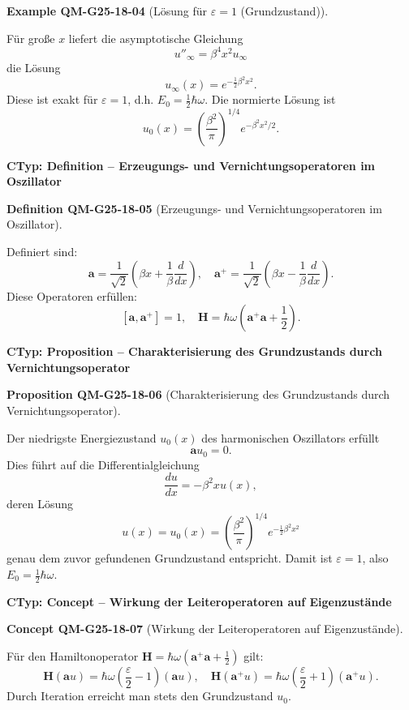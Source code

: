 \documentclass[10pt, letterpaper]{article}
\newcommand{\CustomHeading}[3]{%
  \par\medskip\noindent%
  \textbf{#1 #2} \textnormal{(#3)}.\enskip%
}
\newenvironment{DEF}[2]{\begin{unitbox}\CustomHeading{Definition}{#1}{#2}}{\end{unitbox}}
\newenvironment{PROP}[2]{\begin{unitbox}\CustomHeading{Proposition}{#1}{#2}}{\end{unitbox}}
\newenvironment{EXA}[2]{\begin{unitbox}\CustomHeading{Example}{#1}{#2}}{\end{unitbox}}
\newenvironment{CONC}[2]{\begin{unitbox}\CustomHeading{Concept}{#1}{#2}}{\end{unitbox}}
\begin{document}
\begin{EXA}{QM-G25-18-04}{Lösung für $\varepsilon = 1$ (Grundzustand)}
Für große $x$ liefert die asymptotische Gleichung
\[
u''_\infty = \beta^4 x^2 u_\infty
\]
die Lösung
\[
u_\infty(x) = e^{-\frac{1}{2}\beta^2 x^2}.
\]
Diese ist exakt für $\varepsilon = 1$, d.h. $E_0 = \frac{1}{2}\hbar\omega$. Die normierte Lösung ist
\[
u_0(x) = \left(\frac{\beta^2}{\pi}\right)^{1/4} e^{-\beta^2 x^2 / 2}.
\]
\end{EXA}



\textbf{CTyp: Definition – Erzeugungs- und Vernichtungsoperatoren im Oszillator}

\begin{DEF}{QM-G25-18-05}{Erzeugungs- und Vernichtungsoperatoren im Oszillator}
Definiert sind:
\[
\mathbf{a} = \frac{1}{\sqrt{2}} \left( \beta x + \frac{1}{\beta} \frac{d}{dx} \right), \quad
\mathbf{a}^+ = \frac{1}{\sqrt{2}} \left( \beta x - \frac{1}{\beta} \frac{d}{dx} \right).
\]
Diese Operatoren erfüllen:
\[
[\mathbf{a}, \mathbf{a}^+] = 1, \quad \mathbf{H} = \hbar\omega\left( \mathbf{a}^+ \mathbf{a} + \frac{1}{2} \right).
\]
\end{DEF}


\textbf{CTyp: Proposition – Charakterisierung des Grundzustands durch Vernichtungsoperator}

\begin{PROP}{QM-G25-18-06}{Charakterisierung des Grundzustands durch Vernichtungsoperator}
Der niedrigste Energiezustand $u_0(x)$ des harmonischen Oszillators erfüllt
\[
\mathbf{a} u_0 = 0.
\]
Dies führt auf die Differentialgleichung
\[
\frac{du}{dx} = -\beta^2 x u(x),
\]
deren Lösung
\[
u(x) = u_0(x) = \left(\frac{\beta^2}{\pi}\right)^{1/4} e^{-\frac{1}{2} \beta^2 x^2}
\]
genau dem zuvor gefundenen Grundzustand entspricht. Damit ist $\varepsilon = 1$, also $E_0 = \frac{1}{2} \hbar \omega$.
\end{PROP}


\textbf{CTyp: Concept – Wirkung der Leiteroperatoren auf Eigenzustände}

\begin{CONC}{QM-G25-18-07}{Wirkung der Leiteroperatoren auf Eigenzustände}
Für den Hamiltonoperator $\mathbf{H} = \hbar\omega(\mathbf{a}^+ \mathbf{a} + \frac{1}{2})$ gilt:
\[
\mathbf{H}(\mathbf{a} u) = \hbar\omega \left( \frac{\varepsilon}{2} - 1 \right) (\mathbf{a} u), \quad
\mathbf{H}(\mathbf{a}^+ u) = \hbar\omega \left( \frac{\varepsilon}{2} + 1 \right) (\mathbf{a}^+ u).
\]
Durch Iteration erreicht man stets den Grundzustand $u_0$.
\end{CONC}
\end{document}
